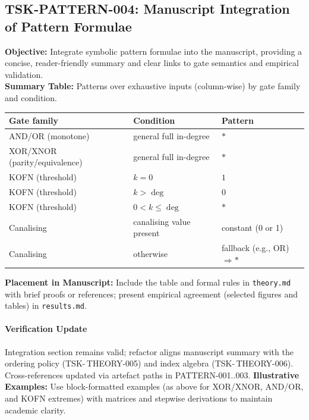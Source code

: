 \documentclass[11pt]{article}
\begin{document}
\subsection{TSK-PATTERN-004: Manuscript Integration of Pattern Formulae}
\textbf{Objective:} Integrate symbolic pattern formulae into the manuscript, providing a concise, reader-friendly summary and clear links to gate semantics and empirical validation.\\
\textbf{Summary Table:} Patterns over exhaustive inputs (column-wise) by gate family and condition.
\begin{center}
\begin{tabular}{lll}
\toprule
\textbf{Gate family} & \textbf{Condition} & \textbf{Pattern} \\
\midrule
AND/OR (monotone) & general full in-degree & $*$ \\
XOR/XNOR (parity/equivalence) & general full in-degree & $*$ \\
KOFN (threshold) & $k=0$ & $1$ \\
KOFN (threshold) & $k>\deg$ & $0$ \\
KOFN (threshold) & $0<k\leq \deg$ & $*$ \\
Canalising & canalising value present & constant (0 or 1) \\
Canalising & otherwise & fallback (e.g., OR) \;$\Rightarrow$\;$*$ \\
\bottomrule
\end{tabular}
\end{center}
\textbf{Placement in Manuscript:} Include the table and formal rules in \texttt{theory.md} with brief proofs or references; present empirical agreement (selected figures and tables) in \texttt{results.md}.\\
\paragraph{Verification Update} Integration section remains valid; refactor aligns manuscript summary with the ordering policy (TSK-\,THEORY-005) and index algebra (TSK-\,THEORY-006). Cross-references updated via artefact paths in PATTERN-001..003.
\textbf{Illustrative Examples:} Use block-formatted examples (as above for XOR/XNOR, AND/OR, and KOFN extremes) with matrices and stepwise derivations to maintain academic clarity.\\
\end{document}
